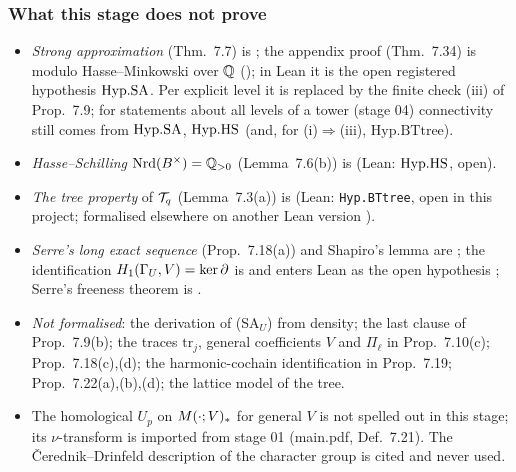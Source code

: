 \endgroup

\subsubsection*{What this stage does not prove}
\begin{itemize}
\item \emph{Strong approximation} (Thm.~7.7) is \stcited; the appendix proof (Thm.~7.34) is \stpmc{} modulo Hasse--Minkowski over
$\mathbb{Q}$ (\stcited); in Lean it is the open registered hypothesis $\mathrm{Hyp.SA}$. Per explicit level it is replaced by the finite check (iii)
of Prop.~7.9; for statements about all levels of a tower (stage 04) connectivity still comes from $\mathrm{Hyp.SA}$, $\mathrm{Hyp.HS}$ (and, for
(i)$\Rightarrow$(iii), $\mathrm{Hyp.BTtree}$).
\item \emph{Hasse--Schilling} $\mathrm{Nrd}(B^\times)=\mathbb{Q}_{>0}$ (Lemma~7.6(b)) is \stcited{} (Lean: $\mathrm{Hyp.HS}$, open).
\item \emph{The tree property} of $\mathcal{T}_q$ (Lemma~7.3(a)) is \stcited{} (Lean: \texttt{Hyp.BTtree}, open in this project; formalised
elsewhere on another Lean version \cite{LM}).
\item \emph{Serre's long exact sequence} (Prop.~7.18(a)) and Shapiro's lemma are \stcited; the identification
$H_1(\Gamma_U,V)=\ker\partial$ is \stpmc{} and enters Lean as the open hypothesis ; Serre's freeness theorem is
.
\item \emph{Not formalised}: the derivation of (SA$_U$) from density; the last clause of Prop.~7.9(b); the traces $\mathrm{tr}_j$,
general coefficients $V$ and $\Pi_\ell$ in Prop.~7.10(c); Prop.~7.18(c),(d); the harmonic-cochain identification in Prop.~7.19;
Prop.~7.22(a),(b),(d); the lattice model of the tree.
\item The homological $U_p$ on $M(\cdot;V)_*$ for general $V$ is not spelled out in this stage; its $\nu$-transform is imported
from stage 01 (main.pdf, Def.~7.21). The \v{C}erednik--Drinfeld description of the character group is cited and never used.
\end{itemize}

